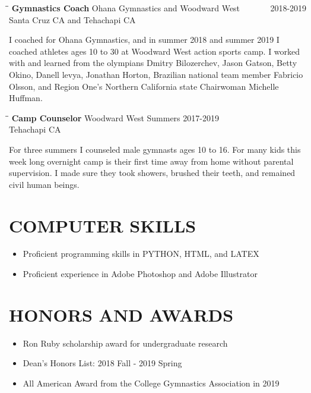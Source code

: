 \documentclass{res}
\begin{document}
\begin{resume}
   \begin{tabbing}%
   \hspace{2.3in}\= \hspace{2.6in}\= \kill %
   {\bf Gymnastics Coach}  \>Ohana Gymnastics and Woodward West \> ~~~~~~ 2018-2019\\
                          \>Santa Cruz CA and Tehachapi CA
   \end{tabbing}\vspace{-20pt}
    I coached for Ohana Gymnastics, and in summer 2018 and summer 2019 I coached athletes ages 10 to 30 at Woodward West action sports camp.  I worked with and learned from the olympians Dmitry Bilozerchev, Jason Gatson, Betty Okino, Danell levya, Jonathan Horton, Brazilian national team member Fabricio Olsson, and Region One's Northern California state Chairwoman Michelle Huffman.
    
   \begin{tabbing}%
   \hspace{2.3in}\= \hspace{2.6in}\= \kill %
   {\bf Camp Counselor}  \>Woodward West \> Summers 2017-2019\\
                          \>Tehachapi CA
   \end{tabbing}\vspace{-20pt}
    For three summers I counseled male gymnasts ages 10 to 16. For many kids this week long overnight camp is their first time away from home without parental supervision. I made sure they took showers, brushed their teeth, and remained civil human beings.



\section{COMPUTER SKILLS}    
	\begin{itemize}
	\item Proficient programming skills in PYTHON, HTML, and LATEX
	\item Proficient experience in Adobe Photoshop and Adobe Illustrator
	\end{itemize}	              
   
 
 
\section{HONORS AND AWARDS}   
	\begin{itemize}
    \item Ron Ruby scholarship award for undergraduate research
    \item Dean's Honors List: 2018 Fall - 2019 Spring
    \item All American Award from the College Gymnastics Association in 2019
    \end{itemize}     
	

\end{resume}
\end{document}
